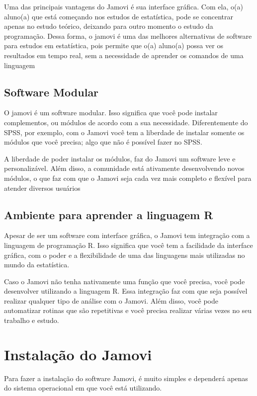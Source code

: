 Uma das principais vantagens do Jamovi é sua interface gráfica. Com ela, o(a) aluno(a) que está começando nos estudos de estatística, pode se concentrar apenas no estudo teórico, deixando para outro momento o estudo da programação. Dessa forma, o jamovi é uma das melhores alternativas de software para estudos em estatística, pois permite que o(a) aluno(a) possa ver os resultados em tempo real, sem a necessidade de aprender os comandos de uma linguagem

\subsection{Software Modular}

O jamovi é um software modular. Isso significa que você pode instalar complementos, ou módulos de acordo com a sua necessidade. Diferentemente do SPSS, por exemplo, com o Jamovi você tem a liberdade de instalar somente os módulos que você precisa; algo que não é possível fazer no SPSS.

A liberdade de poder instalar os módulos, faz do Jamovi um software leve e personalizável. Além disso, a comunidade está ativamente desenvolvendo novos módulos, o que faz com que o Jamovi seja cada vez mais completo e flexível para atender diversos usuários

\subsection{Ambiente para aprender a linguagem R}

Apesar de ser um software com interface gráfica, o Jamovi tem integração com a linguagem de programação R. Isso significa que você tem a facilidade da interface gráfica, com o poder e a flexibilidade de uma das linguagens mais utilizadas no mundo da estatística.

Caso o Jamovi não tenha nativamente uma função que você precisa, você pode desenvolver utilizando a linguagem R. Essa integração faz com que seja possível realizar qualquer tipo de análise com o Jamovi. Além disso, você pode automatizar rotinas que são repetitivas e você precisa realizar várias vezes no seu trabalho e estudo.



\section{Instalação do Jamovi}

Para fazer a instalação do software Jamovi, é muito simples e dependerá apenas do sistema operacional em que você está utilizando.

